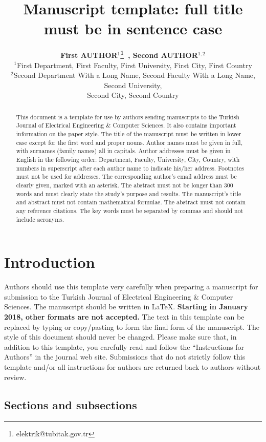 \documentclass{elektr}
\title{Manuscript template: full title must be in sentence case}
\author[AUTHOR and AUTHOR]{
\textbf{First AUTHOR$^{1}$\thanks{elektrik@tubitak.gov.tr}~, Second AUTHOR$^{1,2}$}\\
$^{1}$First Department, First Faculty, First University, First City, First Country\\
$^{2}$Second Department With a Long Name, Second Faculty With a Long Name, Second University,\\ Second City, Second Country
\\ [1.8em]

\rec{.201}
\acc{.201}
\finv{..201}
}
\begin{document}
\maketitle


\begin{abstract}This document is a template for use by authors sending manuscripts to the Turkish Journal of Electrical Engineering {\&} Computer Sciences. It also contains important information on the paper style. The title of the manuscript must be written in lower case except for the first word and proper nouns. Author names must be given in full, with surnames (family names) all in capitals. Author addresses must be given in English in the following order: Department, Faculty, University, City, Country, with numbers in superscript after each author name to indicate his/her address. Footnotes must not be used for addresses. The corresponding author's email address must be clearly given, marked with an asterisk. The abstract must not be longer than 300 words and must clearly state the study's purpose and results. The manuscript's title and abstract must not contain mathematical formulae. The abstract must not contain any reference citations. The key words must be separated by commas and should not include acronyms.

\end{abstract}

\section{Introduction}
\label{Int}

Authors should use this template very carefully when preparing a manuscript for submission to the Turkish Journal of Electrical Engineering {\&} Computer Sciences. The manuscript should be written in \LaTeX. \textbf{Starting in January 2018, other formats are not accepted.} The text in this template can be replaced by typing or copy/pasting to form the final form of the manuscript. The style of this document should never be changed. Please make sure that, in addition to this template, you carefully read and follow the ``Instructions for Authors'' in the journal web site. Submissions that do not strictly follow this template and/or all instructions for authors are returned back to authors without review.

\subsection{Sections and subsections}
\end{document}
